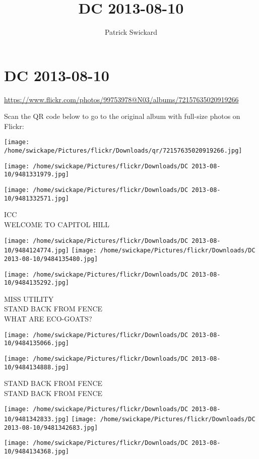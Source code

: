 \documentclass[10pt,letterpaper]{article}
\title{DC 2013-08-10}
\author{Patrick Swickard}
\date{}
\begin{document}
\section*{DC 2013-08-10}

\url{https://www.flickr.com/photos/99753978@N03/albums/72157635020919266}

Scan the QR code below to go to the original album with full-size photos on Flickr:

\texttt{[image: /home/swickape/Pictures/flickr/Downloads/qr/72157635020919266.jpg]}
\pagebreak

\texttt{[image: /home/swickape/Pictures/flickr/Downloads/DC 2013-08-10/9481331979.jpg]}

\vspace{0.25in}
\texttt{[image: /home/swickape/Pictures/flickr/Downloads/DC 2013-08-10/9481332571.jpg]}

ICC\\
WELCOME TO CAPITOL HILL
\pagebreak

\texttt{[image: /home/swickape/Pictures/flickr/Downloads/DC 2013-08-10/9484124774.jpg]}
\texttt{[image: /home/swickape/Pictures/flickr/Downloads/DC 2013-08-10/9484135480.jpg]}

\vspace{0.25in}
\texttt{[image: /home/swickape/Pictures/flickr/Downloads/DC 2013-08-10/9484135292.jpg]}

MISS UTILITY\\
STAND BACK FROM FENCE\\
WHAT ARE ECO{-}GOATS?
\pagebreak

\texttt{[image: /home/swickape/Pictures/flickr/Downloads/DC 2013-08-10/9484135066.jpg]}

\vspace{0.25in}
\texttt{[image: /home/swickape/Pictures/flickr/Downloads/DC 2013-08-10/9484134888.jpg]}

STAND BACK FROM FENCE\\
STAND BACK FROM FENCE
\pagebreak

\texttt{[image: /home/swickape/Pictures/flickr/Downloads/DC 2013-08-10/9481342833.jpg]}
\texttt{[image: /home/swickape/Pictures/flickr/Downloads/DC 2013-08-10/9481342683.jpg]}

\vspace{0.25in}
\texttt{[image: /home/swickape/Pictures/flickr/Downloads/DC 2013-08-10/9484134368.jpg]}
\end{document}

